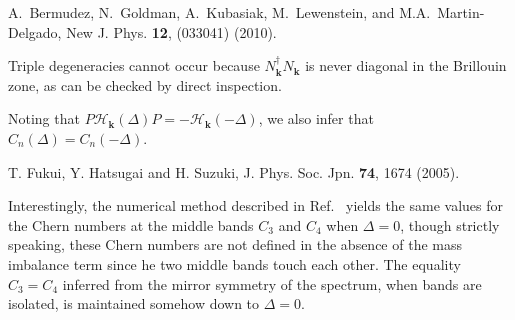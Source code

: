 \documentclass[aps,pra,showpacs,twocolumn,superscriptaddress]{revtex4-1}
\begin{document}
\begin{thebibliography}{11}
 A.~Bermudez, N.~Goldman, A.~Kubasiak, M.~Lewenstein, and M.A.~Martin-Delgado, 
New J. Phys. \textbf{12}, (033041) (2010).


 Triple degeneracies cannot occur because $N_{\mathbf{k}}^\dagger N_{\mathbf{k}}$ is never diagonal in the Brillouin zone, as can be checked by direct inspection. 

 Noting that $P\mathcal{H}_\mathbf{k}(\Delta)P =  -\mathcal{H}_\mathbf{k}(-\Delta)$, we also infer that $C_n(\Delta) = C_n(-\Delta)$. 

 T. Fukui, Y. Hatsugai and H. Suzuki,
J. Phys. Soc. Jpn. \textbf{74}, 1674 (2005). 

 Interestingly, the numerical method described in Ref.~\cite{Fukui2005} yields the same values for 
the Chern numbers at the middle bands $C_3$ and $C_4$ when $\Delta = 0$, though strictly speaking, 
these Chern numbers  are not defined in the absence of the mass imbalance term since he two middle bands
touch each other. 
The equality $C_3=C_4$ inferred from the mirror symmetry of the spectrum, when bands are isolated, 
is maintained somehow down to $\Delta = 0$.







\end{thebibliography}	
\end{document}
